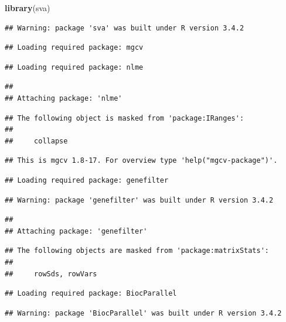 \documentclass[]{article}
\newenvironment{Shaded}{\begin{snugshade}}{\end{snugshade}}
\newcommand{\KeywordTok}[1]{\textcolor[rgb]{0.13,0.29,0.53}{\textbf{{#1}}}}
\newcommand{\NormalTok}[1]{{#1}}
\begin{document}
\begin{Shaded}
\begin{Highlighting}[]
\KeywordTok{library}\NormalTok{(sva)}
\end{Highlighting}
\end{Shaded}

\begin{verbatim}
## Warning: package 'sva' was built under R version 3.4.2
\end{verbatim}

\begin{verbatim}
## Loading required package: mgcv
\end{verbatim}

\begin{verbatim}
## Loading required package: nlme
\end{verbatim}

\begin{verbatim}
## 
## Attaching package: 'nlme'
\end{verbatim}

\begin{verbatim}
## The following object is masked from 'package:IRanges':
## 
##     collapse
\end{verbatim}

\begin{verbatim}
## This is mgcv 1.8-17. For overview type 'help("mgcv-package")'.
\end{verbatim}

\begin{verbatim}
## Loading required package: genefilter
\end{verbatim}

\begin{verbatim}
## Warning: package 'genefilter' was built under R version 3.4.2
\end{verbatim}

\begin{verbatim}
## 
## Attaching package: 'genefilter'
\end{verbatim}

\begin{verbatim}
## The following objects are masked from 'package:matrixStats':
## 
##     rowSds, rowVars
\end{verbatim}

\begin{verbatim}
## Loading required package: BiocParallel
\end{verbatim}

\begin{verbatim}
## Warning: package 'BiocParallel' was built under R version 3.4.2
\end{verbatim}
\end{document}
